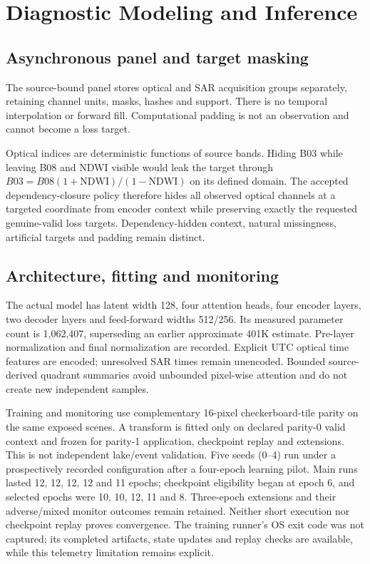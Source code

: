 \documentclass[10pt,twocolumn]{article}
\begin{document}
\section{Diagnostic Modeling and Inference}
\subsection{Asynchronous panel and target masking}
The source-bound panel stores optical and SAR acquisition groups separately, retaining channel units, masks, hashes and support. There is no temporal interpolation or forward fill. Computational padding is not an observation and cannot become a loss target.

Optical indices are deterministic functions of source bands. Hiding B03 while leaving B08 and NDWI visible would leak the target through $B03=B08(1+\mathrm{NDWI})/(1-\mathrm{NDWI})$ on its defined domain. The accepted dependency-closure policy therefore hides all observed optical channels at a targeted coordinate from encoder context while preserving exactly the requested genuine-valid loss targets. Dependency-hidden context, natural missingness, artificial targets and padding remain distinct.

\subsection{Architecture, fitting and monitoring}
The actual model has latent width 128, four attention heads, four encoder layers, two decoder layers and feed-forward widths 512/256. Its measured parameter count is 1,062,407, superseding an earlier approximate 401K estimate. Pre-layer normalization and final normalization are recorded. Explicit UTC optical time features are encoded; unresolved SAR times remain unencoded. Bounded source-derived quadrant summaries avoid unbounded pixel-wise attention and do not create new independent samples.

Training and monitoring use complementary 16-pixel checkerboard-tile parity on the same exposed scenes. A transform is fitted only on declared parity-0 valid context and frozen for parity-1 application, checkpoint replay and extensions. This is not independent lake/event validation. Five seeds (0--4) run under a prospectively recorded configuration after a four-epoch learning pilot. Main runs lasted 12, 12, 12, 12 and 11 epochs; checkpoint eligibility began at epoch 6, and selected epochs were 10, 10, 12, 11 and 8. Three-epoch extensions and their adverse/mixed monitor outcomes remain retained. Neither short execution nor checkpoint replay proves convergence. The training runner's OS exit code was not captured; its completed artifacts, state updates and replay checks are available, while this telemetry limitation remains explicit.
\end{document}
